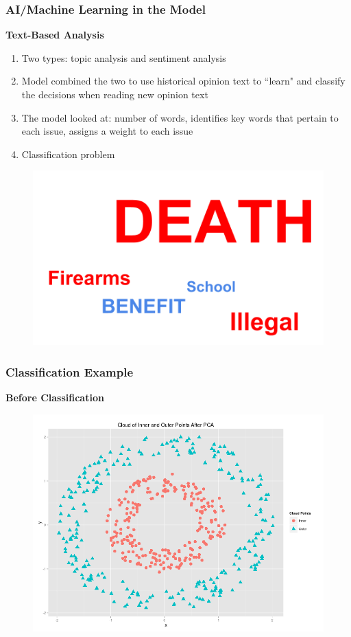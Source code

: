 \documentclass{beamer}
\begin{document}
\begin{frame}
\frametitle{AI/Machine Learning in the Model}
\textbf{Text-Based Analysis}
\begin{enumerate}
	\item Two types: topic analysis and sentiment analysis
	\item Model combined the two to use historical opinion text to ``learn" and classify the decisions when reading new opinion text
	\item The model looked at: number of words, identifies key words that pertain to each issue, assigns a weight to each issue
	\item Classification problem
\end{enumerate}


\begin{figure}[h]
\begin{center}
\includegraphics[width=0.65\columnwidth]{text}
\end{center}
\end{figure}



\end{frame}




\begin{frame}
\frametitle{Classification Example}
\textbf{Before Classification}

\begin{figure}[h]
\begin{center}
\includegraphics[width=0.75\columnwidth]{pre_class}
\end{center}
\end{figure}

\end{frame}
\end{document}
